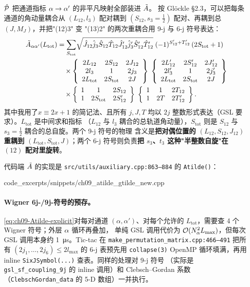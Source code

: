 \(\hat{\mathcal{P}}\) 把通道指标 \(\alpha\to\alpha'\) 的非平凡映射全部装进 \(\tilde{A}\)。
按 Glöckle \cite{Gloeckle1983} \S2.3，可以把每条通道的角动量耦合从
\((L_{12},l_3)\) 配对耦到 \((S_{12},s_3=\tfrac{1}{2})\) 配对、再耦到总
\((J,M_J)\)，并把"(12)3" 变 "(13)2" 的两次重耦合用 9-j 与 6-j 符号表达：
\begin{align}
\label{eq:ch09-Atilde-explicit}
\tilde{A}_{\alpha\alpha'}(L_{\text{tot}})
&=
\sum_{S_{\text{tot}}}\!
\sqrt{
\hat{J}_{12}\hat{j}_3\hat{S}_{12}\hat{T}_{12}
\hat{J}_{12}'\hat{j}_3'\hat{S}_{12}'\hat{T}_{12}'
}
\;(-1)^{S_{12}'+T_{12}'}\,(2 S_{\text{tot}}+1)\notag\\
&\quad\times
\left\{\begin{array}{ccc}2L_{12}&2S_{12}&2J_{12}\\2l_{3}&1&2j_{3}\\2L_{\text{tot}}&2S_{\text{tot}}&2J\end{array}\right\}\;
\left\{\begin{array}{ccc}2L_{12}'&2S_{12}'&2J_{12}'\\2l_{3}'&1&2j_{3}'\\2L_{\text{tot}}&2S_{\text{tot}}&2J\end{array}\right\}\notag\\
&\quad\times
\left\{\begin{array}{ccc}1&1&2S_{12}\\1&2 S_{\text{tot}}&2S_{12}'\end{array}\right\}\;
\left\{\begin{array}{ccc}1&1&2T_{12}\\1&2 T&2T_{12}'\end{array}\right\}.
\end{align}
其中我用了\(\hat{x}\equiv 2x+1\) 的简记法、且所有 \(j,J,T\) 均以
\(2j\) 整数形式表达（GSL 要求）。\(L_{\text{tot}}\) 是中间求和指标
（\(L_{12}\) 与 \(l_3\) 耦合的总轨道角动量），\(S_{\text{tot}}\)
则是 \(S_{12}\) 与 \(s_3=\tfrac{1}{2}\) 耦合的总自旋。两个 9-j 符号的物理
含义是\textbf{把对偶位置的 \((L_{12},S_{12},J_{12})\) 重耦到
\((L_{\text{tot}},S_{\text{tot}},J)\)}；两个 6-j 符号则负责\textbf{把
\(s_3\)、\(t_3\) 这种"半整数自旋"在 \((12)\) 配对里旋转}。

代码端 \(\tilde{A}\) 的实现是 \texttt{src/utils/auxiliary.cpp:863--884} 的
\texttt{Atilde()}：


{code_excerpts/snippets/ch09_atilde_gtilde_new.cpp}

\paragraph{Wigner 6j-/9j-符号的预存。}
\eqref{eq:ch09-Atilde-explicit}对每对通道 \((\alpha,\alpha')\)、对每个允许的
\(L_{\text{tot}}\)，需要查 4 个 Wigner 符号；外层 \(\alpha\) 循环再叠加，
单纯 GSL 调用代价为 \(\mathcal{O}(N_\alpha^2 L_{\max})\)，但每次 GSL 调用本身约
\SI{1}{\micro\second}。Tic-tac 在
\texttt{make\_permutation\_matrix.cpp:466--491} 把所有
\((2j_1,\dots,2j_6)\le 2 l_{\max}\) 的 6-j 表预先用 \texttt{collapse(3)} OpenMP
循环填满，再用 inline \texttt{SixJSymbol(...)} 查表。同样的处理对 9-j 符号
（实际是\texttt{gsl\_sf\_coupling\_9j} 的 inline 调用）和 Clebsch--Gordan 系数
（\texttt{ClebschGordan\_data} 的 5-D 数组）一并执行。

